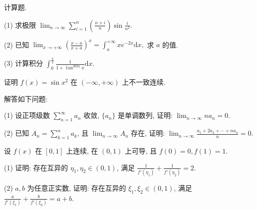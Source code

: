 \par{}
计算题.\par
(1) 求极限 $\lim_{n\to \infty}\sum_{i = 1}^{n}\left(\frac{n + i}{n}\right)\sin \frac{i}{n^2}.$\par
(2) 已知 $\lim_{x\to +\infty}\left(\frac{x - a}{x + a}\right)^x = \int_a^{+\infty}xe^{-2x}\mathrm{d}x,$ 求 $a$ 的值.\par
(3) 计算积分 $\int_0^{\frac{\pi}{2}}\frac{1}{1 + \tan^{2024}x}\mathrm{d}x.$\par
\par{}
证明 $f(x) = \sin x^2$ 在 $(- \infty, +\infty)$ 上不一致连续.\par
\par{}
解答如下问题:\par
(1) 设正项级数 $\sum_{n=1}^{\infty} a_n$ 收敛, $\{a_n\}$ 是单调数列, 证明: $\lim_{n \to \infty} na_n = 0$.\par
(2) 已知 $A_{n} = \sum_{k=1}^{n} a_{k}$, 且 $\lim_{n \to \infty} A_{n}$ 存在, 证明: $\lim_{n \to \infty} \frac{a_{1} + 2a_{2} + \cdots + na_{n}}{n} = 0$.\par
\par{}
设 $f(x)$ 在 $[0,1]$ 上连续, 在 $(0,1)$ 上可导, 且 $f(0) = 0, f(1) = 1$.\par
(1) 证明: 存在互异的 $\eta_1, \eta_2 \in (0,1)$, 满足 $\frac{1}{f'(\eta_1)} + \frac{1}{f'(\eta_2)} = 2$.\par
(2) $a, b$ 为任意正实数, 证明: 存在互异的 $\xi_1, \xi_2 \in (0,1)$, 满足 $\frac{a}{f'(\xi_1)} + \frac{b}{f'(\xi_2)} = a + b$.\par
\par{}
